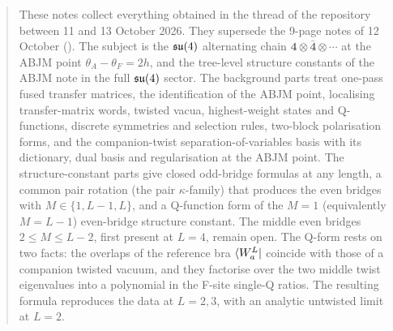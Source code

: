 \begin{abstract}
\noindent These notes collect everything obtained in the  thread of the  repository
between 11 and 13 October 2026. They supersede the 9-page notes of 12 October
(). The subject is the $\su(4)$ alternating chain
$\mathbf 4\otimes\bar{\mathbf 4}\otimes\cdots$ at the ABJM point $\theta_A-\theta_F=2h$, and the tree-level structure
constants of the ABJM note in the full $\su(4)$ sector. The background parts treat one-pass fused transfer matrices,
the identification of the ABJM point, localising transfer-matrix words, twisted vacua, highest-weight states and
Q-functions, discrete symmetries and selection rules, two-block polarisation forms, and the companion-twist
separation-of-variables basis with its dictionary, dual basis and regularisation at the ABJM point. The structure-constant
parts give closed odd-bridge formulas at any length, a common pair rotation (the pair $\kappa$-family) that produces the
even bridges with $M\in\{1,L-1,L\}$, and a Q-function form of the $M=1$ (equivalently $M=L-1$) even-bridge structure
constant. The middle even bridges $2\le M\le L-2$, first present at $L=4$, remain open. The Q-form rests on two facts: the overlaps of
the reference bra $\bra{W_a^L}$ coincide with those of a companion twisted vacuum, and they factorise over the two middle
twist eigenvalues into a polynomial in the F-site single-Q ratios. The resulting formula reproduces the data at
$L=2,3$, with an analytic untwisted limit at $L=2$.
\end{abstract}
